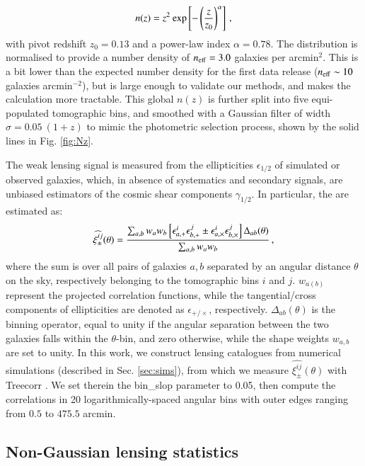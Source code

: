 \begin{eqnarray}
n (z) =  z^2 \: {\rm exp} \left[-\left(\frac{z}{z_0}\right)^\alpha \right]\, ,
\label{eq:nz}
\end{eqnarray}
with pivot redshift $z_0=0.13$ and a power-law index $\alpha = 0.78$.
The distribution is normalised to provide a number density of $n_{\rm eff} = 3.0 $  galaxies per arcmin$^{2}$.
This is a bit lower than the expected number density for the first data release ($n_{\rm eff}\sim10$ galaxies arcmin$^{-2}$), but is large enough to validate our methods, and makes the calculation more tractable.
This global $n(z)$ is further split into five equi-populated tomographic bins, and smoothed with a Gaussian filter of width $\sigma = 0.05 \: (1 + z)$ to mimic the photometric selection process, shown by the solid lines in Fig. \ref{fig:Nz}. 

The weak lensing signal is measured from the ellipticities $\epsilon_{1/2}$ of simulated or observed galaxies, which, in absence of systematics and secondary signals, are unbiased estimators  of the cosmic shear components $\gamma_{1/2}$.
In particular, the \gtwopcf are estimated as:
\begin{eqnarray}
\widehat{\xi_{\pm}^{ij}}(\theta) = \frac{\sum_{a,b} w_a w_b \left[\epsilon_{a, \rm +}^i\epsilon_{b, \rm +}^j     \pm \epsilon_{a, \times}^i\epsilon_{b, \times}^j    \right]\Delta_{ab}(\theta)}{\sum_{a,b} w_a w_b} \, ,
\label{eq:2PCF_estimator}
\end{eqnarray}
where the sum is over all pairs of galaxies $a, b$ separated by an angular distance $\theta$ on the sky, respectively belonging to the tomographic bins $i$ and $j$.
$w_{a (b)}$ represent the projected correlation functions, while the tangential/cross components of ellipticities are denoted as $\epsilon_{+/\times}$, respectively. 
$\Delta_{ab}(\theta)$ is the binning operator, equal to unity if the angular separation between the two galaxies falls within the $\theta$-bin, and zero otherwise, while the shape weights $w_{a,b}$ are set to unity.
In this work, we construct lensing catalogues from numerical simulations (described in Sec. \ref{sec:sims}), from which we measure $ \widehat{\xi_{\pm}^{ij}}(\theta)$ with {\sc Treecorr} \citep{TreeCorr}.
We set therein the {\sc bin\_slop} parameter to 0.05, then compute the correlations in 20 logarithmically-spaced angular bins with outer edges ranging from $0.5$ to $475.5$ arcmin. 
 
 
\subsection{Non-Gaussian lensing statistics}
\label{subsec:beyond-2pt}

